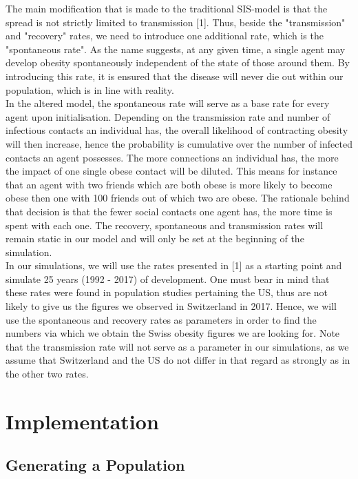 \documentclass[11pt]{article}
\begin{document}
The main modification that is made to the traditional SIS-model is that the spread is not strictly limited to  transmission [1]. Thus, beside the "transmission" and "recovery" rates, we need to introduce one additional rate, which is the "spontaneous rate". As the name suggests, at any given time, a single agent may develop obesity spontaneously independent of the state of those around them. By introducing this rate, it is ensured that the disease will never die out within our population, which is in line with reality.\\

In the altered model, the spontaneous rate will serve as a base rate for every agent upon initialisation. Depending on the transmission rate and number of infectious contacts an individual has, the overall likelihood of contracting obesity will then increase, hence the probability is cumulative over the number of infected contacts an agent possesses. The more connections an individual has, the more the impact of one single obese contact will be diluted. This means for instance that an agent with two friends which are both obese is more likely to become obese then one with 100 friends out of which two are obese. The rationale behind that decision is that the fewer social contacts one agent has, the more time is spent with each one. The recovery, spontaneous and transmission rates will remain static in our model and will only be set at the beginning of the simulation.
\\

In our simulations, we will use the rates presented in [1] as a starting point and simulate 25 years (1992 - 2017) of development. One must bear in mind that these rates were found in population studies pertaining the US, thus are not likely to give us the figures we observed in Switzerland in 2017. Hence, we will use the spontaneous and recovery rates as parameters in order to find the numbers via which we obtain the Swiss obesity figures we are looking for. Note that the transmission rate will not serve as a parameter in our simulations, as we assume that Switzerland and the US do not differ in that regard as strongly as in the other two rates.

\section{Implementation}

\subsection{Generating a Population}
\end{document}
